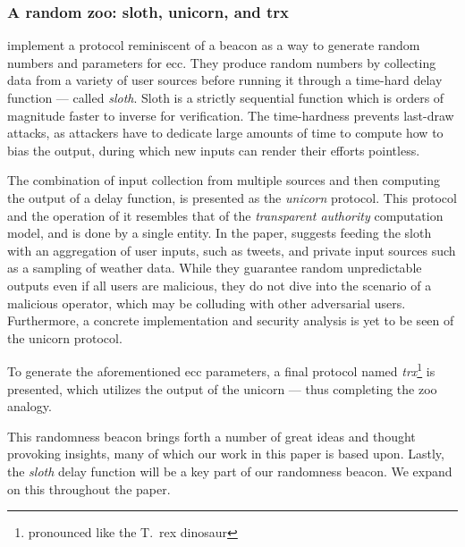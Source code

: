 \subsubsection{A random zoo: sloth, unicorn, and trx}%
\label{sub:random_zoo}
\citet{randomzoo} implement a protocol reminiscent of a beacon as a way to generate random numbers and parameters for \gls{ecc}.
They produce random numbers by collecting data from a variety of user sources before running it through a time-hard delay function --- called \textit{sloth}.
Sloth is a strictly sequential function which is orders of magnitude faster to inverse for verification.
The time-hardness prevents last-draw attacks, as attackers have to dedicate large amounts of time to compute how to bias the output, during which new inputs can render their efforts pointless.

The combination of input collection from multiple sources and then computing the output of a delay function, is presented as the \textit{unicorn} protocol.
This protocol and the operation of it resembles that of the \emph{transparent authority} computation model, and is done by a single entity.
In the paper, \citeauthor{randomzoo} suggests feeding the sloth with an aggregation of user inputs, such as tweets, and private input sources such as a sampling of weather data.
While they guarantee random unpredictable outputs even if all users are malicious, they do not dive into the scenario of a malicious operator, which may be colluding with other adversarial users.
Furthermore, a concrete implementation and security analysis is yet to be seen of the unicorn protocol.

To generate the aforementioned \gls{ecc} parameters, a final protocol named \textit{trx}\footnote{pronounced like the T.\ rex dinosaur} is presented, which utilizes the output of the unicorn --- thus completing the zoo analogy.

This randomness beacon brings forth a number of great ideas and thought provoking insights, many of which our work in this paper is based upon.
Lastly, the \emph{sloth} delay function will be a key part of our randomness beacon.
We expand on this throughout the paper.

